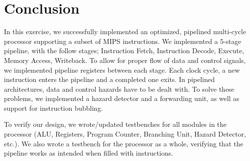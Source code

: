 \chapter{Conclusion}

In this exercise, we successfully implemented an optimized, pipelined multi-cycle processor supporting a subset of MIPS instructions.
We implemented a 5-stage pipeline, with the follow stages; Instruction Fetch, Instruction Decode, Execute, Memory Access, Writeback.
To allow for proper flow of data and control signals, we implemented pipeline registers between each stage.
Each clock cycle, a new instruction enters the pipeline and a completed one exits.
In pipelined architectures, data and control hazards have to be dealt with.
To solve these problems, we implemented a hazard detector and a forwarding unit, as well as support for instruction bubbling.

To verify our design, we wrote/updated testbenches for all modules in the processor (ALU, Registers, Program Counter, Branching Unit, Hazard Detector, etc.).
We also wrote a testbench for the processor as a whole, verifying that the pipeline works as intended when filled with instructions.
